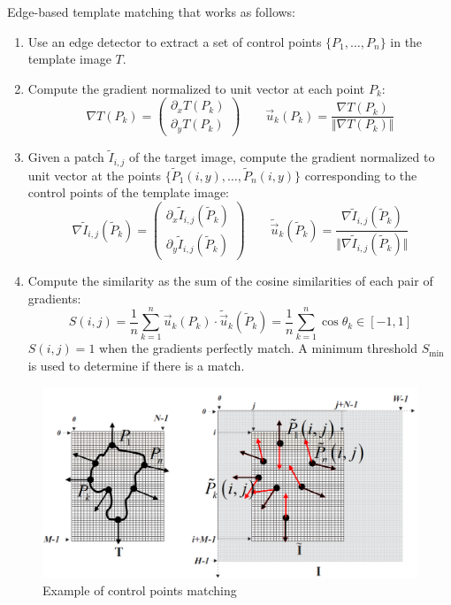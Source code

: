Edge-based template matching that works as follows:
\begin{enumerate}
    \item Use an edge detector to extract a set of control points $\{ P_1, \dots, P_n \}$ in the template image $T$.
    \item Compute the gradient normalized to unit vector at each point $P_k$:
        \[ \nabla T(P_k) = \begin{pmatrix} \partial_x T(P_k) \\ \partial_y T(P_k) \end{pmatrix} \hspace{2em} \vec{u}_k(P_k) = \frac{\nabla T(P_k)}{\Vert \nabla T(P_k) \Vert} \]
    \item Given a patch $\tilde{I}_{i,j}$ of the target image, 
        compute the gradient normalized to unit vector at the points $\{ \tilde{P}_1(i, y), \dots, \tilde{P}_n(i, y) \}$ 
        corresponding to the control points of the template image:
        \[ 
            \nabla \tilde{I}_{i,j}(\tilde{P}_k) = \begin{pmatrix} \partial_x \tilde{I}_{i,j}(\tilde{P}_k) \\ \partial_y \tilde{I}_{i,j}(\tilde{P}_k) \end{pmatrix} \hspace{2em} 
            \tilde{\vec{u}}_k(\tilde{P}_k) = \frac{\nabla \tilde{I}_{i,j}(\tilde{P}_k)}{\Vert \nabla \tilde{I}_{i,j}(\tilde{P}_k) \Vert} 
        \]
    \item Compute the similarity as the sum of the cosine similarities of each pair of gradients:
        \[ S(i, j) = \frac{1}{n} \sum_{k=1}^{n} \vec{u}_k(P_k) \cdot \tilde{\vec{u}}_k(\tilde{P}_k) = \frac{1}{n} \sum_{k=1}^{n} \cos \theta_k \in [-1, 1] \]
        $S(i, j) = 1$ when the gradients perfectly match. A minimum threshold $S_\text{min}$ is used to determine if there is a match.
\end{enumerate}

\begin{figure}[H]
    \centering
    \includegraphics[width=0.5\linewidth]{./img/shape_based_matching.png}
    \caption{Example of control points matching}
\end{figure}



